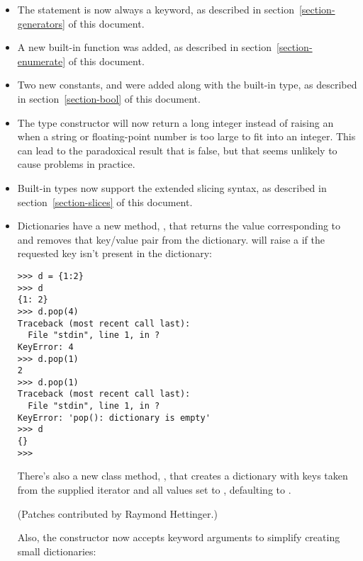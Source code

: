 \documentclass{howto}
\begin{document}
\begin{itemize}
\item The  statement is now always a keyword, as
described in section~\ref{section-generators} of this document.

\item A new built-in function 
was added, as described in section~\ref{section-enumerate} of this
document.

\item Two new constants,  and  were
added along with the built-in  type, as described in
section~\ref{section-bool} of this document.

\item The  type constructor will now return a long
integer instead of raising an  when a string
or floating-point number is too large to fit into an integer.  This
can lead to the paradoxical result that
 is false, but that seems
unlikely to cause problems in practice.

\item Built-in types now support the extended slicing syntax,
as described in section~\ref{section-slices} of this document.

\item Dictionaries have a new method, , that
returns the value corresponding to  and removes that
key/value pair from the dictionary.   will raise a
 if the requested key isn't present in the
dictionary:

\begin{verbatim}
>>> d = {1:2}
>>> d
{1: 2}
>>> d.pop(4)
Traceback (most recent call last):
  File "stdin", line 1, in ?
KeyError: 4
>>> d.pop(1)
2
>>> d.pop(1)
Traceback (most recent call last):
  File "stdin", line 1, in ?
KeyError: 'pop(): dictionary is empty'
>>> d
{}
>>>
\end{verbatim}

There's also a new class method, 
, that 
creates a dictionary with keys taken from the supplied iterator
 and all values set to , defaulting to
.  

(Patches contributed by Raymond Hettinger.)

Also, the  constructor now accepts keyword arguments to
simplify creating small dictionaries:


\end{itemize}
\end{document}
